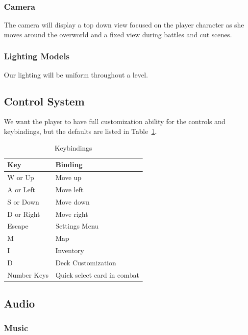 \documentclass[12pt,titlepage]{article}
\begin{document}
\subsubsection{Camera}

The camera will display a top down view focused on the player character as she 
moves around the overworld and a fixed view during battles and cut scenes.

\subsubsection{Lighting Models}

Our lighting will be uniform throughout a level.

\subsection{Control System}

We want the player to have full customization ability for the controls and 
keybindings, but the defaults are listed in Table~\ref{tab:keybindings}.

\begin{table}[H]
	\caption{Keybindings}
	\label{tab:keybindings}
	\centering
	\begin{tabular}{|l|l|}
		\hline
		\textbf{Key} & \textbf{Binding} \\
		\hline\hline
		W or Up & Move up \\
		A or Left & Move left \\
		S or Down &  Move down \\
		D or Right & Move right \\
		Escape & Settings Menu \\
		M & Map \\
		I & Inventory \\
		D & Deck Customization \\
		Number Keys & Quick select card in combat \\
		\hline
	\end{tabular}
\end{table}

\subsection{Audio}

\subsubsection{Music}
\end{document}
